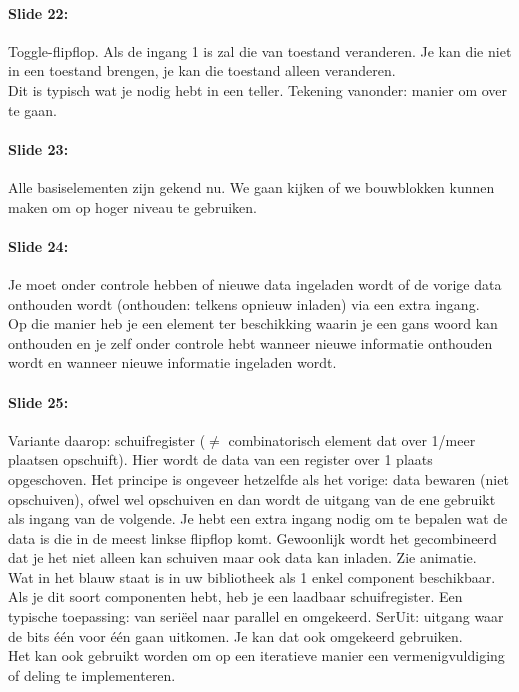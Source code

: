\documentclass[10pt,a4paper]{book}
\begin{document}
\paragraph{Slide 22:} Toggle-flipflop. Als de ingang 1 is zal die van toestand veranderen. Je kan die niet in een toestand brengen, je kan die toestand alleen veranderen.\\
Dit is typisch wat je nodig hebt in een teller. Tekening vanonder: manier om over te gaan.

\paragraph{Slide 23:} Alle basiselementen zijn gekend nu. We gaan kijken of we bouwblokken kunnen maken om op hoger niveau te gebruiken.

\paragraph{Slide 24:} Je moet onder controle hebben of nieuwe data ingeladen wordt of de vorige data onthouden wordt (onthouden: telkens opnieuw inladen) via een extra ingang.\\
Op die manier heb je een element ter beschikking waarin je een gans woord kan onthouden en je zelf onder controle hebt wanneer nieuwe informatie onthouden wordt en wanneer nieuwe informatie ingeladen wordt.

\paragraph{Slide 25:} Variante daarop: schuifregister ($\neq$ combinatorisch element dat over 1/meer plaatsen opschuift). Hier wordt de data van een register over 1 plaats opgeschoven. Het principe is ongeveer hetzelfde als het vorige: data bewaren (niet opschuiven), ofwel wel opschuiven en dan wordt de uitgang van de ene gebruikt als ingang van de volgende. Je hebt een extra ingang nodig om te bepalen wat de data is die in de meest linkse flipflop komt. Gewoonlijk wordt het gecombineerd dat je het niet alleen kan schuiven maar ook data kan inladen. Zie animatie.\\
Wat in het blauw staat is in uw bibliotheek als 1 enkel component beschikbaar. Als je dit soort componenten hebt, heb je een laadbaar schuifregister. Een typische toepassing: van seri\"eel naar parallel en omgekeerd. SerUit: uitgang waar de bits \'e\'en voor \'e\'en gaan uitkomen. Je kan dat ook omgekeerd gebruiken.\\
Het kan ook gebruikt worden om op een iteratieve manier een vermenigvuldiging of deling te implementeren. 
\end{document}
